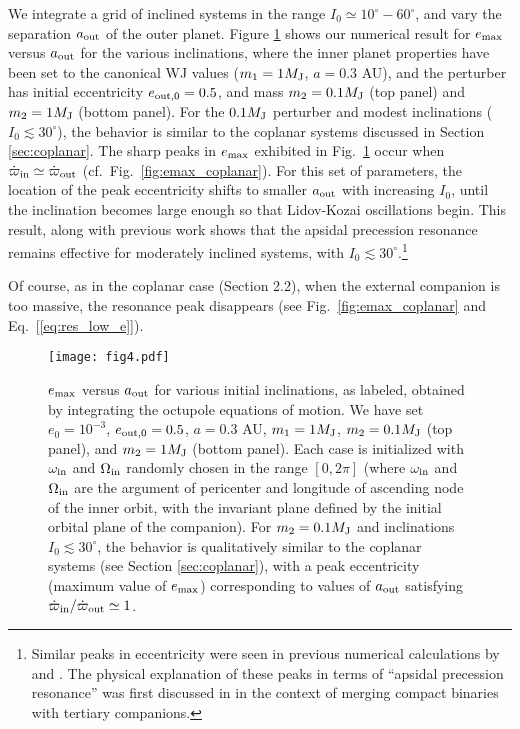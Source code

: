 \documentclass[12pt,useAMS, usenatbib]{mn2e}
\newcommand{\Max}{{\rm max}}
\newcommand{\In}{{\rm in}}
\newcommand{\Out}{{\rm out}}
\newcommand{\aout}{a_\Out}
\newcommand{\emax}{e_\Max}
\newcommand{\mjup}{M_{\rm J}}
\begin{document}
We integrate a grid of inclined systems in the range $I_0 \simeq 10^\circ-60^\circ$, and vary the separation $\aout$ of the outer planet.  Figure \ref{fig:emax_inclined} shows our numerical result for $\emax$ versus $\aout$ for the various inclinations, where the inner planet properties have been set to the canonical WJ values ($m_1 = 1 \mjup$, $a = 0.3$ AU), and the perturber has initial eccentricity $e_{\Out,0} = 0.5$, and mass $m_2 = 0.1 \mjup$ (top panel) and $m_2 = 1 \mjup$ (bottom panel).  For the $0.1 \mjup$ perturber and modest inclinations ($I_0 \lesssim 30^\circ$), the behavior is similar to the coplanar systems discussed in Section \ref{sec:coplanar}.  The sharp peaks in $\emax$ exhibited in Fig.~\ref{fig:emax_inclined} occur when $\dot{\varpi}_\In \simeq \dot{\varpi}_\Out$ (cf.~Fig.~\ref{fig:emax_coplanar}).  For this set of parameters, the location of the peak eccentricity shifts to smaller $\aout$ with increasing $I_0$, until the inclination becomes large enough so that Lidov-Kozai oscillations begin.  This result, along with previous work \citep{liu2015b} shows that the apsidal precession resonance remains effective for moderately inclined systems, with $I_0 \lesssim 30^\circ$.\footnote{Similar peaks in eccentricity were seen in previous numerical calculations by \cite{ford2000} and \citep{naoz2013}.  The physical explanation of these peaks
in terms of ``apsidal precession resonance'' was first discussed in \cite{liu2015b} in the context of merging compact binaries with tertiary companions.}  

Of course, as in the coplanar case (Section 2.2), when the external companion is too massive, the resonance peak disappears (see Fig.~\ref{fig:emax_coplanar} and Eq.~[\ref{eq:res_low_e}]).

\begin{figure}
\centering 
\texttt{[image: fig4.pdf]}
\caption{$\emax$ versus $\aout$ for various initial inclinations, as labeled, obtained by integrating the octupole equations of motion.  We have set $e_0 = 10^{-3}$, $e_{\Out,0} = 0.5$, $a = 0.3$ AU, $m_1 = 1 \mjup$, $m_2 = 0.1 \mjup$ (top panel), and $m_2 = 1 \mjup$ (bottom panel).  Each case is initialized with $\omega_\In$ and $\Omega_\In$ randomly chosen in the range $[0, 2 \pi]$ (where $\omega_\In$ and $\Omega_\In$ are the argument of pericenter and longitude of ascending node of the inner orbit, with the invariant plane defined by the initial orbital plane of the companion).  For $m_2 = 0.1 \mjup$ and inclinations $I_0 \lesssim 30^\circ$, the behavior is qualitatively similar to the coplanar systems (see Section \ref{sec:coplanar}), with a peak eccentricity (maximum value of $\emax$) corresponding to values of $\aout$ satisfying $\dot{\varpi}_\In / \dot{\varpi}_\Out \simeq 1$.}
\label{fig:emax_inclined}
\end{figure}
\end{document}

